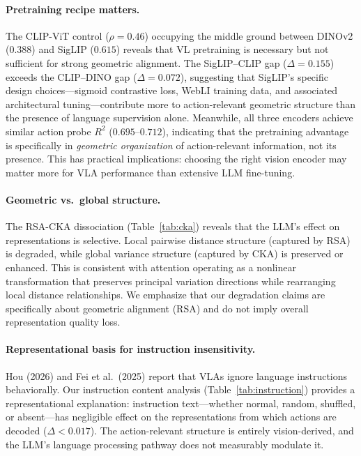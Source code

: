 \documentclass[letterpaper]{article}
\begin{document}
\paragraph{Pretraining recipe matters.}
The CLIP-ViT control ($\rho{=}0.46$) occupying the middle ground between DINOv2 ($0.388$) and SigLIP ($0.615$) reveals that VL pretraining is necessary but not sufficient for strong geometric alignment.
The SigLIP--CLIP gap ($\Delta{=}0.155$) exceeds the CLIP--DINO gap ($\Delta{=}0.072$), suggesting that SigLIP's specific design choices---sigmoid contrastive loss, WebLI training data, and associated architectural tuning---contribute more to action-relevant geometric structure than the presence of language supervision alone.
Meanwhile, all three encoders achieve similar action probe $R^2$ ($0.695$--$0.712$), indicating that the pretraining advantage is specifically in \emph{geometric organization} of action-relevant information, not its presence.
This has practical implications: choosing the right vision encoder may matter more for VLA performance than extensive LLM fine-tuning.

\paragraph{Geometric vs.\ global structure.}
The RSA-CKA dissociation (Table~\ref{tab:cka}) reveals that the LLM's effect on representations is selective.
Local pairwise distance structure (captured by RSA) is degraded, while global variance structure (captured by CKA) is preserved or enhanced.
This is consistent with attention operating as a nonlinear transformation that preserves principal variation directions while rearranging local distance relationships.
We emphasize that our degradation claims are specifically about geometric alignment (RSA) and do not imply overall representation quality loss.

\paragraph{Representational basis for instruction insensitivity.}
Hou (2026) and Fei et al.\ (2025) report that VLAs ignore language instructions behaviorally.
Our instruction content analysis (Table~\ref{tab:instruction}) provides a representational explanation: instruction text---whether normal, random, shuffled, or absent---has negligible effect on the representations from which actions are decoded ($\Delta < 0.017$).
The action-relevant structure is entirely vision-derived, and the LLM's language processing pathway does not measurably modulate it.
\end{document}
